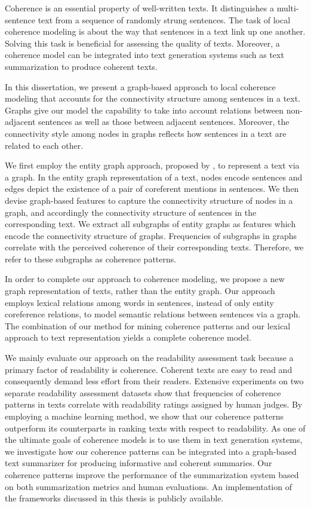 \addchap*{\abstractname}

Coherence is an essential property of well-written texts. 
It distinguishes a multi-sentence text from a sequence of randomly strung sentences. 
The task of local coherence modeling is about the way that sentences in a text link up one another.  
Solving this task is beneficial for assessing the quality of texts. 
Moreover, a coherence model can be integrated into text generation systems such as text summarization to produce coherent texts.  

In this dissertation, we present a graph-based approach to local coherence modeling that accounts for the connectivity structure among sentences in a text. 
Graphs give our model the capability to take into account relations between non-adjacent sentences as well as those between adjacent sentences. 
Moreover, the connectivity style among nodes in graphs reflects how sentences in a text are related to each other. 

We first employ the entity graph approach, proposed by , to represent a text via a graph. 
In the entity graph representation of a text, nodes encode sentences and edges depict the existence of a pair of coreferent mentions in sentences. 
We then devise graph-based features to capture the connectivity structure of nodes in a graph, and accordingly the connectivity structure of sentences in the corresponding text. 
We extract all subgraphs of entity graphs as features which encode the connectivity structure of graphs.    
Frequencies of subgraphs in graphs correlate with the perceived coherence of their corresponding texts. 
Therefore, we refer to these subgraphs as coherence patterns. 

In order to complete our approach to coherence modeling, we propose a new graph representation of texts, rather than the entity graph.  
Our approach employs lexical relations among words in sentences, instead of only entity coreference relations, to model semantic relations between sentences via a graph. 
The combination of our method for mining coherence patterns and our lexical approach to text representation yields a complete coherence model. 

We mainly evaluate our approach on the readability assessment task because a primary factor of readability is coherence. 
Coherent texts are easy to read and consequently demand less effort from their readers. 
Extensive experiments on two separate readability assessment datasets show that frequencies of coherence patterns in texts correlate with readability ratings assigned by human judges.     
By employing a machine learning method, we show that our coherence patterns outperform its counterparts in ranking texts with respect to readability.   
As one of the ultimate goals of coherence models is to use them in text generation systems, we investigate how our coherence patterns can be integrated into a graph-based text summarizer for producing informative and coherent summaries. 
Our coherence patterns improve the performance of the summarization system based on both summarization metrics and human evaluations.  
An implementation of the frameworks discussed in this thesis is publicly available.

